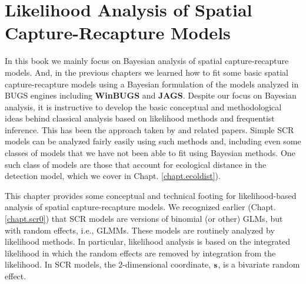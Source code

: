 \chapter{
Likelihood Analysis of Spatial Capture-Recapture Models
}
\label{chapt.mle}


\vspace{.3in}



In this book we mainly focus on Bayesian analysis of spatial
capture-recapture models. And, in the previous chapters we learned how
to fit some basic spatial capture-recapture models using a Bayesian
formulation of the models analyzed in BUGS engines including {\bf
  WinBUGS} and {\bf JAGS}.  Despite our focus on Bayesian analysis, it
is instructive to develop the basic conceptual and methodological
ideas behind classical analysis based on likelihood methods and
frequentist inference.  
This has been the approach taken by
\citet{borchers_efford:2008, dawson_efford:2009} and related papers.
Simple SCR models can be analyzed
fairly easily using such methods and, including even some classes of
models that we have not been able to fit using Bayesian methods. One
such class of models are those
that account for ecological distance in the detection model,
which we cover in  Chapt. \ref{chapt.ecoldist}).


This chapter provides some conceptual and technical footing for
likelihood-based analysis of spatial capture-recapture models. We
recognized earlier (Chapt. \ref{chapt.scr0}) that SCR models are versions of
binomial (or other) GLMs, but with random effects, i.e., GLMMs. These
models are 
routinely analyzed by likelihood methods. In particular, likelihood
analysis is based on the integrated likelihood in which the random
effects are removed by integration from the likelihood. In SCR models,
the 2-dimensional coordinate, ${\bf s}$, is a
bivariate random effect. 

